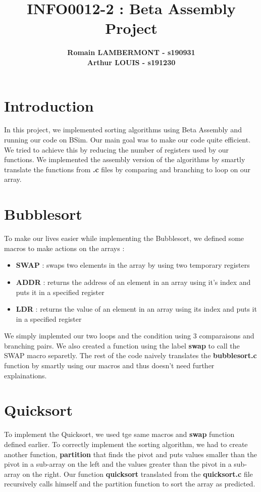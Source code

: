 \documentclass{article}
\begin{document}

\title{\Large{ INFO0012-2 : Beta Assembly Project}}
\vspace{1cm}
\author{\small{\bf Romain LAMBERMONT - s190931} \\ \small{\bf Arthur LOUIS - s191230}}

\maketitle

\section{Introduction}
In this project, we implemented sorting algorithms using Beta Assembly and running our code on BSim. 
Our main goal was to make our code quite efficient. We tried to achieve this by reducing the number of registers used by our functions.
We implemented the assembly version of the algorithms by smartly translate the functions from \textbf{.c} files by comparing and branching to loop on our array.

\section{Bubblesort}
To make our lives easier while implementing the Bubblesort, we defined some macros to make actions on the arrays :
\begin{itemize}
    \item \textbf{SWAP} : swaps two elements in the array by using two temporary registers
    \item \textbf{ADDR} : returns the address of an element in an array using it's index and puts it in a specified register
    \item \textbf{LDR} : returns the value of an element in an array using its index and puts it in a specified register
\end{itemize}

We simply implemted our two loops and the condition using 3 comparaisons and branching pairs. We also created a function using the label \textbf{swap} to call the 
SWAP macro separetly. The rest of the code naively translates the \textbf{bubblesort.c} function by smartly using our macros and thus doesn't need further explainations.

\section{Quicksort}
To implement the Quicksort, we used tge same macros and \textbf{swap} function defined earlier. To correctly implement the sorting algorithm, we had to create another function, 
\textbf{partition} that finds the pivot and puts values smaller than the pivot in a sub-array on the left and the values greater than the pivot in a sub-array on the right. Our function 
\textbf{quicksort} translated from the \textbf{quicksort.c} file recursively calls himself and the partition function to sort the array as predicted.
\end{document}
